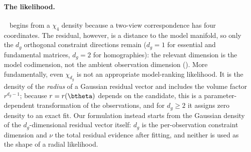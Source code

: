 \paragraph{The \magsacpp likelihood.}
\magsacpp~\cite{Barath2020} begins from a $\chi_4$ density because a
two-view correspondence has four coordinates.  The residual, however,
is a distance to the model manifold, so only the $d_g$ orthogonal
constraint directions remain ($d_g = 1$ for essential and fundamental
matrices, $d_g = 2$ for homographies): the relevant dimension is the
model codimension, not the ambient observation dimension
().  More fundamentally, even $\chi_{d_g}$ is not
an appropriate model-ranking likelihood.  It is the density of the
\emph{radius} of a Gaussian residual vector and includes the volume
factor $r^{d_g-1}$; because $r = r(\btheta)$ depends on the candidate,
this is a parameter-dependent transformation of the observations, and
for $d_g \geq 2$ it assigns zero density to an exact fit.  Our
formulation instead starts from the Gaussian density of the
$d_g$-dimensional residual vector itself: $d_g$ is the per-observation
constraint dimension and $\nu$ the total residual evidence after
fitting, and neither is used as the shape of a radial likelihood.
